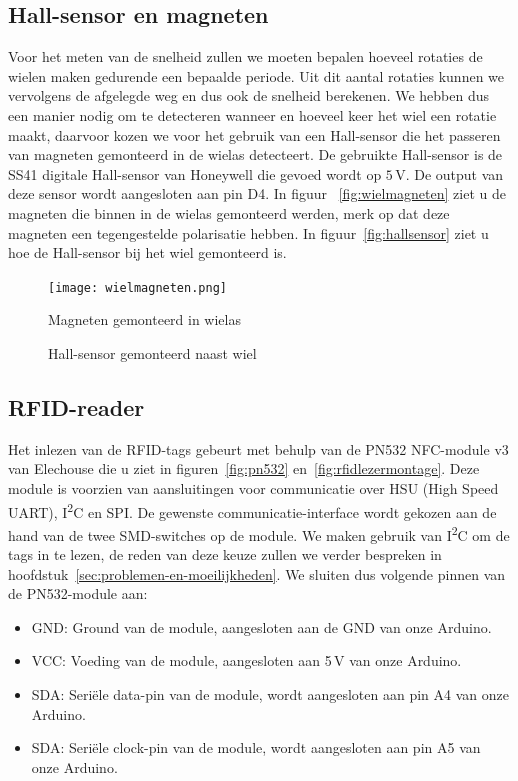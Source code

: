 \subsection{Hall-sensor en magneten}\label{sec:hall-sensor}
Voor het meten van de snelheid zullen we moeten bepalen hoeveel rotaties de wielen maken gedurende een bepaalde periode. Uit dit aantal rotaties kunnen we vervolgens de afgelegde weg en dus ook de snelheid berekenen. We hebben dus een manier nodig om te detecteren wanneer en hoeveel keer het wiel een rotatie maakt, daarvoor kozen we voor het gebruik van een Hall-sensor die het passeren van magneten gemonteerd in de wielas detecteert. De gebruikte Hall-sensor is de SS41 digitale Hall-sensor van Honeywell die gevoed wordt op $5\,\mathrm{V}$. De output van deze sensor wordt aangesloten aan pin D4. In figuur ~\vref{fig:wielmagneten} ziet u de magneten die binnen in de wielas gemonteerd werden, merk op dat deze magneten een tegengestelde polarisatie hebben. In figuur~\vref{fig:hallsensor} ziet u hoe de Hall-sensor bij het wiel gemonteerd is.

\begin{figure}[H]
	\centering
	\begin{minipage}[b]{0.4\textwidth}
		\centering
		\texttt{[image: wielmagneten.png]}
		\caption{Magneten gemonteerd in wielas\label{fig:wielmagneten}}
	\end{minipage}
	\hfill
	\begin{minipage}[b]{0.4\textwidth}
		\centering
		\caption{Hall-sensor gemonteerd naast wiel\label{fig:hallsensor}}
	\end{minipage}
\end{figure}

\subsection{RFID-reader}
Het inlezen van de RFID-tags gebeurt met behulp van de PN532 NFC-module v3 van Elechouse die u ziet in figuren~\ref{fig:pn532} en~\ref{fig:rfidlezermontage}. Deze module is voorzien van aansluitingen voor communicatie over HSU (High Speed UART), I\textsuperscript{2}C en SPI. De gewenste communicatie-interface wordt gekozen aan de hand van de twee SMD-switches op de module. We maken gebruik van I\textsuperscript{2}C om de tags in te lezen, de reden van deze keuze zullen we verder bespreken in hoofdstuk~\vref{sec:problemen-en-moeilijkheden}. We sluiten dus volgende pinnen van de PN532-module aan:
\begin{itemize}
	\item GND: Ground van de module, aangesloten aan de GND van onze Arduino.
	\item VCC: Voeding van de module, aangesloten aan 5\,V van onze Arduino.
	\item SDA: Seri\"ele data-pin van de module, wordt aangesloten aan pin A4 van onze Arduino.
	\item SDA: Seri\"ele clock-pin van de module, wordt aangesloten aan pin A5 van onze Arduino.
\end{itemize}

